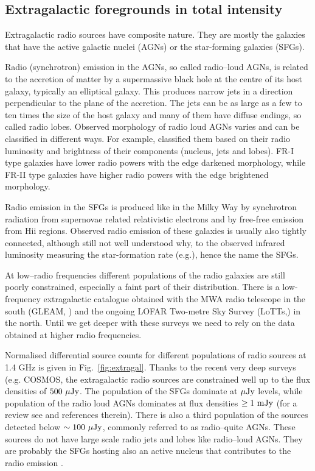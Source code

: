 \subsection{Extragalactic foregrounds in total intensity}
Extragalactic radio sources have composite nature.  They are mostly the galaxies that have the active galactic nuclei (AGNs) or the star-forming galaxies (SFGs). 

Radio (synchrotron) emission in the AGNs, so called radio--loud AGNs, is related to the accretion of matter by a supermassive black hole at the centre of its host galaxy, typically an elliptical galaxy.  This produces narrow  jets in a direction perpendicular to the plane of the accretion. The jets can be as large as a few to ten times the size 
of the host galaxy and many of them have diffuse endings, so called radio lobes. Observed morphology of radio loud AGNs varies and can be classified in different ways. For example, \cite{fanaroff74} classified them based on their radio luminosity and brightness of their components (nucleus, jets and lobes). FR-I type galaxies have lower radio powers with the edge darkened morphology, while  FR-II type galaxies have higher radio powers with the edge brightened morphology.

Radio emission in the SFGs is produced like in the Milky Way by synchrotron radiation from supernovae related relativistic electrons and by free-free emission from H{\sc ii} regions. Observed radio emission of these galaxies is usually also tightly connected, although still not well understood why, to the observed infrared luminosity measuring the star-formation rate (e.g.\cite{helou85,condon92,jarvis10}), hence the name the SFGs. 

At low--radio frequencies different populations of the radio galaxies are still poorly constrained, especially a faint part of their distribution. There is a low-frequency extragalactic catalogue obtained with the MWA radio telescope in the south (GLEAM, \cite{hurleywalker17}) and the ongoing LOFAR Two-metre Sky Survey (LoTTs,\cite{shimwell17, shimwell19}) in the north. Until we get deeper with these surveys we need to rely on the data obtained at higher radio frequencies.

Normalised differential source counts for different populations of radio sources at 1.4 GHz is given in Fig.~\ref{fig:extragal}. Thanks to the recent very deep surveys (e.g. COSMOS, \cite{bondi08, smolcic17a, smolcic17b, smolcic17c} the extragalactic radio sources are constrained well up to the flux densities of $500~{\rm \mu Jy}$. The population of the SFGs dominate at $\mu{\rm Jy}$ levels, while population of the radio loud AGNs dominates at flux densities $\geq1~{{\rm mJy}}$ (for a review see \cite{prandoniIAUS333} and references therein). There is also a third population of the sources detected below $\sim100~{\rm \mu Jy}$, commonly referred to as radio--quite AGNs. These sources do not have large scale radio jets and lobes like radio--loud AGNs. They are probably the SFGs hosting also an active nucleus that contributes to the radio emission \cite{delvecchio17}. 

